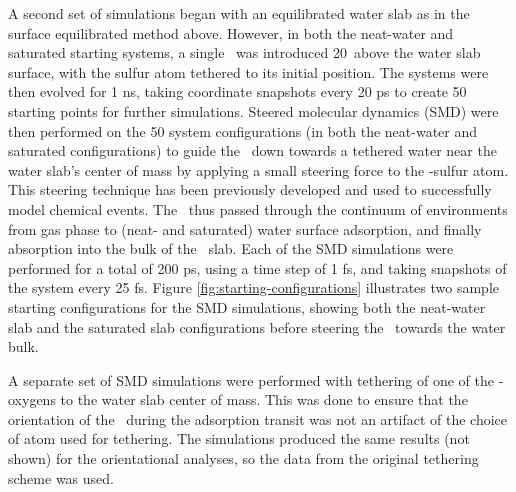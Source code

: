 \documentclass{article}
\begin{document}
A second set of simulations began with an equilibrated water slab as in the surface equilibrated method above. However, in both the neat-water and saturated starting systems, a single \suldiox~was introduced 20\angs~above the water slab surface, with the sulfur atom tethered to its initial position. The systems were then evolved for 1 ns, taking coordinate snapshots every 20 ps to create 50 starting points for further simulations. Steered molecular dynamics (SMD) were then performed on the 50 system configurations (in both the neat-water and saturated configurations) to guide the \suldiox~down towards a tethered water near the water slab's center of mass by applying a small steering force to the \suldiox-sulfur atom. This steering technique has been previously developed and used to successfully model chemical events.\cite{Isralewitz2001,Giorgino2011,Bizzarri2011,Strzelecki2009,Patargias2009,Liu2006} The \suldiox~thus passed through the continuum of environments from gas phase to (neat- and saturated) water surface adsorption, and finally absorption into the bulk of the \wat~slab. Each of the SMD simulations were performed for a total of 200 ps, using a time step of 1 fs, and taking snapshots of the system every 25 fs. Figure \ref{fig:starting-configurations} illustrates two sample starting configurations for the SMD simulations, showing both the neat-water slab and the saturated slab configurations before steering the \suldiox~towards the water bulk.

A separate set of SMD simulations were performed with tethering of one of the \suldiox-oxygens to the water slab center of mass. This was done to ensure that the orientation of the \suldiox~during the adsorption transit was not an artifact of the choice of atom used for tethering. The simulations produced the same results (not shown) for the orientational analyses, so the data from the original tethering scheme was used.
\end{document}
